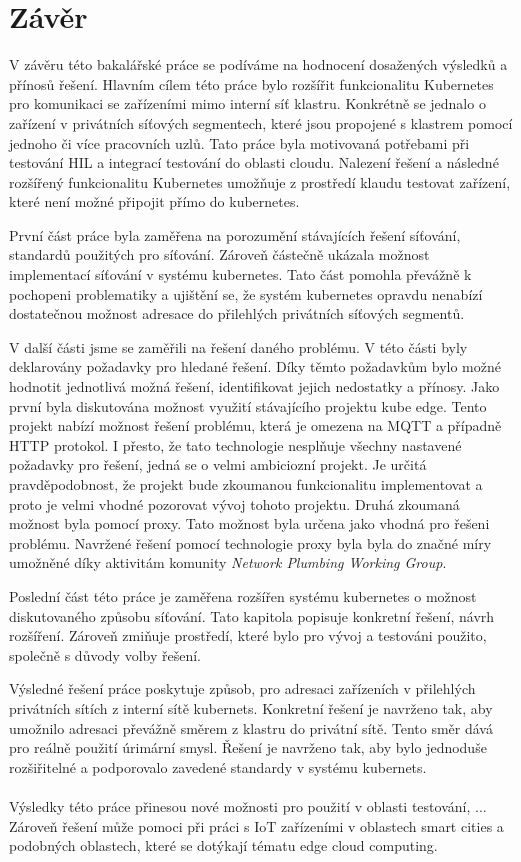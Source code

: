 \chapter{Závěr}
V závěru této bakalářské práce se podíváme na hodnocení dosažených výsledků a přínosů řešení. Hlavním cílem této práce bylo rozšířit funkcionalitu Kubernetes pro komunikaci se zařízeními mimo interní síť klastru. Konkrétně se jednalo o zařízení v privátních síťových segmentech, které jsou propojené s klastrem pomocí jednoho či více pracovních uzlů. Tato práce byla motivovaná potřebami při testování HIL a integrací testování do oblasti cloudu. Nalezení řešení a následné rozšířený funkcionalitu Kubernetes umožňuje z prostředí klaudu testovat zařízení, které není možné připojit přímo do kubernetes.    

První část práce byla zaměřena na porozumění stávajících řešení síťování, standardů použitých pro síťování. Zároveň částečně ukázala možnost implementací síťování v systému kubernetes. Tato část pomohla převážně k pochopeni problematiky a ujištění se, že systém kubernetes opravdu nenabízí dostatečnou možnost adresace do přilehlých privátních síťových segmentů.

V další části jsme se zaměřili na řešení daného problému. V této části byly deklarovány požadavky pro hledané řešení. Díky těmto požadavkům bylo možné hodnotit jednotlivá možná řešení, identifikovat jejich nedostatky a přínosy. Jako první byla diskutována možnost využití stávajícího projektu kube edge. Tento projekt nabízí možnost řešení problému, která je omezena na MQTT a případně HTTP protokol. I přesto, že tato technologie nesplňuje všechny nastavené požadavky pro řešení, jedná se o velmi ambiciozní projekt. Je určitá pravděpodobnost, že projekt bude zkoumanou funkcionalitu implementovat a proto je velmi vhodné pozorovat vývoj tohoto projektu. Druhá zkoumaná možnost byla pomocí proxy. Tato možnost byla určena jako vhodná pro řešeni problému. Navržené řešení pomocí technologie proxy byla byla do značné míry umožněné díky aktivitám komunity \textit{Network Plumbing Working Group}.

Poslední část této práce je zaměřena rozšířen systému kubernetes o možnost diskutovaného způsobu síťování. Tato kapitola popisuje konkretní řešení, návrh rozšíření. Zároveň zmiňuje prostředí, které bylo pro vývoj a testováni použito, společně s důvody volby řešení.

Výsledné řešení práce poskytuje způsob, pro adresaci zařízeních v přilehlých privátních sítích z interní sítě kubernets. Konkretní řešení je navrženo tak, aby umožnilo adresaci převážně směrem z klastru do privátní sítě. Tento směr dává pro reálně použití úrimární smysl. Řešení je navrženo tak, aby bylo jednoduše rozšiřitelné a podporovalo zavedené standardy v systému kubernets.
\\\\
Výsledky této práce přinesou nové možnosti pro použití v oblasti testování, ... Zároveň řešení může pomoci při práci s IoT zařízeními v oblastech smart cities a podobných oblastech, které se dotýkají tématu edge cloud computing.

